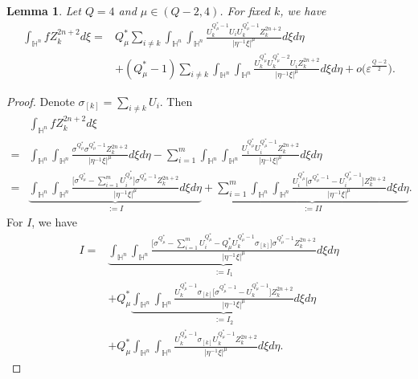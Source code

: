 \documentclass[11pt]{article}
\newtheorem{lemma}{Lemma}[section]
\begin{document}
\begin{lemma}\label{main3}
Let $Q=4$ and $\mu\in (Q-2,4)$. For fixed $k$, we have
\begin{align*}
\int_{\mathbb{H}^n } f Z_k^{2n+2}  d\xi=&Q^{\ast}_{\mu} \sum_{i\neq k}\int_{\mathbb{H}^{n}}\int_{\mathbb{H}^{n}}
\frac{U_k^{Q^{\ast}_{\mu}-1}U_iU_k^{Q^{\ast}_{\mu}-1}Z_k^{2n+2}}
{|\eta^{-1}\xi|^{\mu}}d \xi{d}\eta \\
&+(Q^{\ast}_{\mu}-1)\sum_{i\neq k}
\int_{\mathbb{H}^{n}}\int_{\mathbb{H}^{n}}\frac{U_k^{Q^{\ast}_{\mu}}U_k^{Q^{\ast}_{\mu}-2}U_iZ_k^{2n+2}}
{|\eta^{-1}\xi|^{\mu}}d\xi{d}\eta
+o\Big(\varepsilon^{\frac{Q-2}{2}}\Big).
\end{align*}
\end{lemma}
\begin{proof}
Denote $\sigma_{[k]}=\sum\limits_{i\neq k}U_i$. Then
\begin{align}\label{main30}
  &\int_{\mathbb{H}^{n}}fZ_k^{2n+2} d\xi \nonumber  \\=&\int_{\mathbb{H}^{n}}\int_{\mathbb{H}^{n}}\frac{\sigma^{Q^{\ast}_{\mu}}\sigma^{Q^{\ast}_{\mu}-1}Z_k^{2n+2}}
{|\eta^{-1}\xi|^{\mu}}d\xi{d}\eta-\sum\limits_{i=1}^m
\int_{\mathbb{H}^{n}}\int_{\mathbb{H}^{n}}\frac{U_i^{Q^{\ast}_{\mu}}U_i^{Q^{\ast}_{\mu}-1}Z_k^{2n+2}}
{|\eta^{-1}\xi|^{\mu}}d\xi{d}\eta \nonumber\\
=&\underbrace{\int_{\mathbb{H}^{n}}\int_{\mathbb{H}^{n}}\frac{\Big[\sigma^{Q^{\ast}_{\mu}}-\sum\limits_{i=1}^mU_i^{Q^{\ast}_{\mu}}\Big]\sigma^{Q^{\ast}_{\mu}-1}Z_k^{2n+2}}
{|\eta^{-1}\xi|^{\mu}}d\xi{d}\eta}_{:=I}+\underbrace{\sum\limits_{i=1}^m
\int_{\mathbb{H}^{n}}\int_{\mathbb{H}^{n}}\frac{U_i^{Q^{\ast}_{\mu}}\Big[\sigma^{Q^{\ast}_{\mu}-1}-U_i^{Q^{\ast}_{\mu}-1}\Big]Z_k^{2n+2}}
{|\eta^{-1}\xi|^{\mu}}d\xi{d}\eta}_{:=II}.
\end{align}
For $I$, we have
\begin{align}\label{main31}
  I=&\underbrace{\int_{\mathbb{H}^{n}}\int_{\mathbb{H}^{n}}\frac{
  \Big[\sigma^{Q^{\ast}_{\mu}}-\sum\limits_{i=1}^mU_i^{Q^{\ast}_{\mu}}-Q_\mu^*U_k^{Q^{\ast}_{\mu}-1}\sigma_{[k]}\Big]\sigma^{Q^{\ast}_{\mu}-1}Z_k^{2n+2}}
{|\eta^{-1}\xi|^{\mu}}d\xi{d}\eta}_{:=I_1} \nonumber\\
&+Q_\mu^*\underbrace{\int_{\mathbb{H}^{n}}\int_{\mathbb{H}^{n}}\frac{U_k^{Q^{\ast}_{\mu}-1}\sigma_{[k]}\Big[\sigma^{Q^{\ast}_{\mu}-1}-U_k^{Q^{\ast}_{\mu}-1}\Big]Z_k^{2n+2}}{|\eta^{-1}\xi|^{\mu}}d\xi{d}\eta}_{:=I_2}
\nonumber\\
&+Q_\mu^*\int_{\mathbb{H}^{n}}\int_{\mathbb{H}^{n}}\frac{U_k^{Q^{\ast}_{\mu}-1}\sigma_{[k]}U_k^{Q^{\ast}_{\mu}-1}Z_k^{2n+2}}{|\eta^{-1}\xi|^{\mu}}d\xi{d}\eta.

\end{align}
\end{proof}
\end{document}
